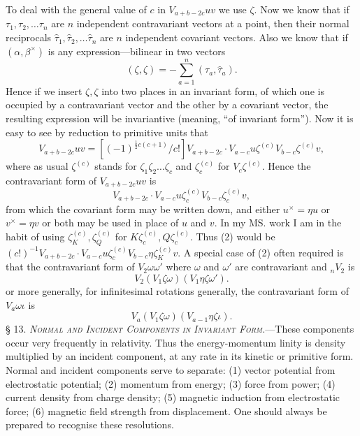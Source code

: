 \documentclass[11pt]{article}
\begin{document}
\indent To deal with the general value of $c$ in $V_{a+b-2c}uv$ we use $\zeta$. Now we know that if $\tau_1,\tau_2,\ldots\tau_n$ are $n$ independent contravariant vectors at a point, then their normal reciprocals $\hat{\tau}_1,\hat{\tau}_2,\ldots\hat{\tau}_n$ are $n$ independent covariant vectors. Also we know that if $(\alpha,\beta^\times)$ is any expression---bilinear in two vectors
\[
(\zeta,\zeta)=-\sum_{a=1}^n(\tau_a,\hat{\tau}_a).
\]
Hence if we insert $\zeta,\zeta$ into two places in an invariant form, of which one is occupied by a contravariant vector and the other by a covariant vector, the resulting expression will be invariantive (meaning, ``of invariant form''). Now it is easy to see by reduction to primitive units that
\begin{equation}V_{a+b-2c}uv=[(-1)^{\frac12c(c+1)}/c!]V_{a+b-2c}\cdot V_{a-c}u\zeta^{(c)}V_{b-c}\zeta^{(c)}v,\tag{1}\end{equation}
where as usual $\zeta^{(c)}$ stands for $\zeta_1\zeta_2\ldots\zeta_c$ and $\zeta_c^{(c)}$ for $V_c\zeta^{(c)}$. Hence the contravariant form of $V_{a+b-2c}uv$ is
\begin{equation}[(-1)^{\frac12c(c+1)}/c!]V_{a+b-2c}\cdot V_{a-c}u\zeta_c^{(c)}V_{b-c}\zeta_c^{(c)}v,\tag{2}\end{equation}
from which the covariant form may be written down, and either $u^\times=\eta u$ or $v^\times=\eta v$ or both may be used in place of $u$ and $v$. In my MS. work I
am in the habit of using $\zeta_K^{(c)},\zeta_Q^{(c)}$ for $K\zeta_c^{(c)},Q\zeta_c^{(c)}$. Thus (2) would be $(c!)^{-1}V_{a+b-2c}\cdot V_{a-c}u\zeta_c^{(c)}V_{b-c}\eta\zeta_K^{(c)}v$. A special case of (2) often required is that the contravariant form of $V_2\omega\omega'$ where $\omega$ and $\omega'$ are contravariant and ${}_nV_2$ is
\begin{equation}V_2(V_1\zeta\omega)(V_1\eta\zeta\omega').\tag{3}\end{equation}
or more generally, for infinitesimal rotations generally, the contravariant form of $V_a\omega\iota$ is
\begin{equation}V_a(V_1\zeta\omega)(V_{a-1}\eta\zeta\iota).\tag{4}\end{equation}
\noindent\textsc{§ 13. \emph{Normal and Incident Components in Invariant Form.}}---These components occur very frequently in relativity. Thus the energy-momentum linity is density multiplied by an incident component, at any rate in its kinetic or primitive form. Normal and incident components serve to separate: (1) vector potential from electrostatic potential; (2) momentum from energy; (3) force from power; (4) current density from charge density; (5) magnetic induction from electrostatic force; (6) magnetic field strength from displacement. One should always be prepared to recognise these resolutions.
\end{document}
